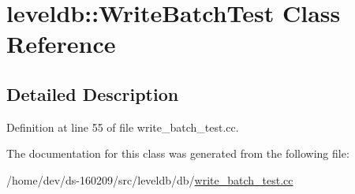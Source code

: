 \hypertarget{classleveldb_1_1_write_batch_test}{}\section{leveldb\+:\+:Write\+Batch\+Test Class Reference}
\label{classleveldb_1_1_write_batch_test}


\subsection{Detailed Description}


Definition at line 55 of file write\+\_\+batch\+\_\+test.\+cc.



The documentation for this class was generated from the following file\+:\begin{DoxyCompactItemize}
\item 
/home/dev/ds-\/160209/src/leveldb/db/\hyperlink{write__batch__test_8cc}{write\+\_\+batch\+\_\+test.\+cc}\end{DoxyCompactItemize}
